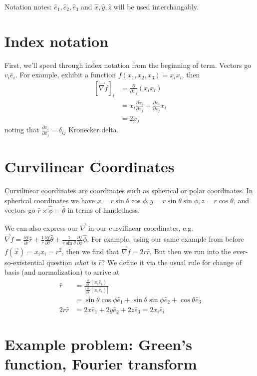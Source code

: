 \documentclass[10pt]{report}
\newcommand{\pd}[2]{\frac{\partial #1}{\partial#2}}
\newcommand{\abs}[1]{\left|#1\right|}
\begin{document}
Notation notes: $\hat{e}_1, \hat{e}_2, \hat{e}_3$ and $\hat{x}, \hat{y}, \hat{z}$ will be used interchangably.

\section{Index notation}
First, we'll speed through index notation from the beginning of term. Vectors go $v_i\hat{e}_i$. For example, exhibit a function $f(x_1, x_2, x_3) = x_ix_i$, then 
\begin{align}
    \left[ \vec{\nabla}f \right]_i &= \pd{}{x_j}\left( x_i x_i \right)\\
    &= x_i\pd{x_i}{x_j} + \pd{x_i}{x_j}x_i\\
    &= 2x_j
\end{align}
noting that $\pd{x_i}{x_j} = \delta_{ij}$ Kronecker delta.

\section{Curvilinear Coordinates}
Curvilinear coordinates are coordinates such as spherical or polar coordinates. In spherical coordinates we have $x = r\sin\theta\cos\phi, y = r\sin\theta\sin\phi, z = r\cos\theta$, and vectors go $\hat{r} \times \hat{\phi} = \hat{\theta}$ in terms of handedness.

We can also express our $\vec{\nabla}$ in our curvilinear coordinates, e.g. $\vec{\nabla}f = \pd{f}{r}\hat{r} + \frac{1}{r}\pd{f}{\theta}\hat{\theta} + \frac{1}{r\sin\theta}\pd{f}{\phi}\hat{\phi}$. For example, using our same example from before $f(\vec{x}) = x_ix_i = r^2$, then we find that $\vec{\nabla}f = 2r\hat{r}$. But then we run into the ever-so-existential question \emph{what is $\hat{r}$}? We define it via the usual rule for change of basis (and normalization) to arrive at
\begin{align}
    \hat{r} &= \frac{\pd{}{r}\left( x_i\hat{e}_i \right)}{\abs{\pd{}{r}\left( x_i\hat{e}_i \right)}} \\
    &= \sin\theta\cos\phi \hat{e}_1 + \sin\theta\sin\phi\hat{e}_2 + \cos\theta \hat{e}_3\\
    2r\hat{r} &= 2x\hat{e}_1 + 2y\hat{e}_2 + 2z\hat{e}_3 = 2x_i\hat{e}_i
\end{align}

\section{Example problem: Green's function, Fourier transform}
\end{document}
